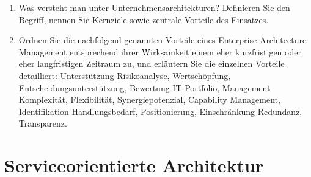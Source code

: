 \begin{universityTask}
\begin{enumerate}[label=(\alph*)]
\begin{minipage}[t]{\textwidth}
\begin{figure}[H]
                \end{figure}
            \end{minipage}
        \item Was versteht man unter Unternehmensarchitekturen? Definieren Sie den Begriff, nennen Sie Kernziele sowie zentrale Vorteile des Einsatzes.
        \item Ordnen Sie die nachfolgend genannten Vorteile eines Enterprise Architecture Management entsprechend ihrer Wirksamkeit einem eher kurzfristigen oder eher langfristigen Zeitraum zu, und erläutern Sie die einzelnen Vorteile detailliert: \linebreak
        Unterstützung Risikoanalyse, Wertschöpfung, Entscheidungsunterstützung, Bewertung IT-Portfolio, Management Komplexität, Flexibilität, Synergiepotenzial, Capability Management, Identifikation Handlungsbedarf, Positionierung, Einschränkung Redundanz, Transparenz.
    \end{enumerate}
\end{universityTask}

\section{Serviceorientierte Architektur}
\label{sec:03-01_service-oriented-architecture}

